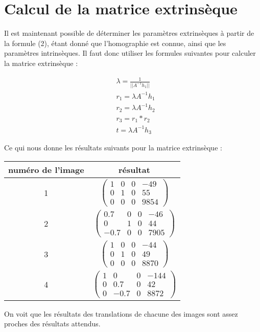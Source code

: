 \documentclass[a4paper,10pt]{article}
\begin{document}
\section{Calcul de la matrice extrinsèque}
Il est maintenant possible de déterminer les paramètres extrinsèques à partir de la formule (2),
étant donné que l'homographie est connue, ainsi que les paramètres intrinsèques. Il faut donc utiliser
les formules suivantes pour calculer la matrice extrinsèque : 

\begin{align}
 &\lambda = \frac{1}{||A^{-1}h_1||}\\
 &r_1=\lambda A^{-1}h_1\\
 &r_2=\lambda A^{-1}h_2\\
 &r_3=r_1*r_2\\
 &t=\lambda A^{-1}h_3
\end{align}

Ce qui nous donne les résultats suivants pour la matrice extrinsèque :\\ 

\begin{center}
\begin{tabular}{|c|c|}
 \hline
 numéro de l'image & résultat\\
 \hline
 1 & $\begin{pmatrix} 1 & 0 & 0 & -49\\0 & 1 & 0 & 55\\ 0 & 0 & 0 & 9854\end{pmatrix}$\\
 \hline
 2 & $\begin{pmatrix} 0.7 & 0 & 0 & -46\\0 & 1 & 0 & 44\\ -0.7 & 0 & 0 & 7905\end{pmatrix}$\\
 \hline
 3 & $\begin{pmatrix} 1 & 0 & 0 & -44\\0 & 1 & 0 & 49\\ 0 & 0 & 0 & 8870\end{pmatrix}$\\
 \hline
 4 & $\begin{pmatrix} 1 & 0 & 0 & -144\\0 & 0.7 & 0 & 42\\ 0 & -0.7 & 0 & 8872\end{pmatrix}$\\
 \hline
\end{tabular}
\end{center}
On voit que les résultats des translations de chacune des images sont assez proches des résultats
attendus. 
\end{document}
